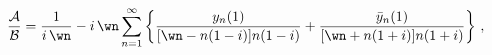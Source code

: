 \begin{equation}
 {{\cal A}\over {\cal B}} = {1\over i\, \wn } - i\, \wn \sum\limits_{n=1}^{\infty}
\left\{ {y_n(1)  \over [\wn - n (1-i)] n (1-i)} +
{\bar{y}_n (1)  \over [\wn + n (1+i)] n (1+i)}\right\}\,,
\label{restoration}
\end{equation}

